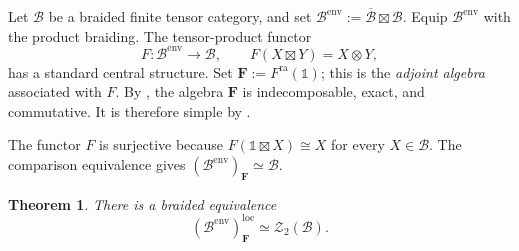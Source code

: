 \documentclass[10pt,a4paper]{amsart}
\numberwithin{equation}{section}
\newtheorem{theorem}[thmctr]{Theorem}
\newcommand{\unit}{\mathds{1}}
\newcommand{\B}{\mathcal{B}}
\newcommand{\Z}{\mathcal{Z}}
\newcommand{\loc}{\mathrm{loc}}
\newcommand{\ra}{\mathrm{ra}}
\newcommand{\oB}{\overline{\B}}
\newcommand{\bF}{\mathbf{F}}
\begin{document}
Let $\B$ be a braided finite tensor category, and set
$\B^{\mathrm{env}}:=\oB\boxtimes\B$. Equip $\B^{\mathrm{env}}$ with the
product braiding. The tensor-product functor
\[
  F:\B^{\mathrm{env}}\longrightarrow\B,
  \qquad
  F(X\boxtimes Y)=X\otimes Y,
\]
has a standard central structure. Set $\bF:=F^\ra(\unit)$; this is the
\emph{adjoint algebra} associated with $F$. By
\cite[Proposition~6.6]{shimizu2026commutative}, the algebra $\bF$ is
indecomposable, exact, and commutative. It is therefore simple by
\cite[Theorem~7.1]{coulembier2025simple}.

The functor $F$ is surjective because $F(\unit\boxtimes X)\cong X$ for every
$X\in\B$. The comparison equivalence
\cite[Proposition~2.3]{etingof2004analogue} gives $(\B^{\mathrm{env}})_\bF\simeq\B$.

\begin{theorem}\label{thm:adjoint-algebra-local-modules}
There is a braided equivalence
\[
  (\B^{\mathrm{env}})_\bF^{\loc}\simeq\Z_2(\B).
\]
\end{theorem}
\end{document}
